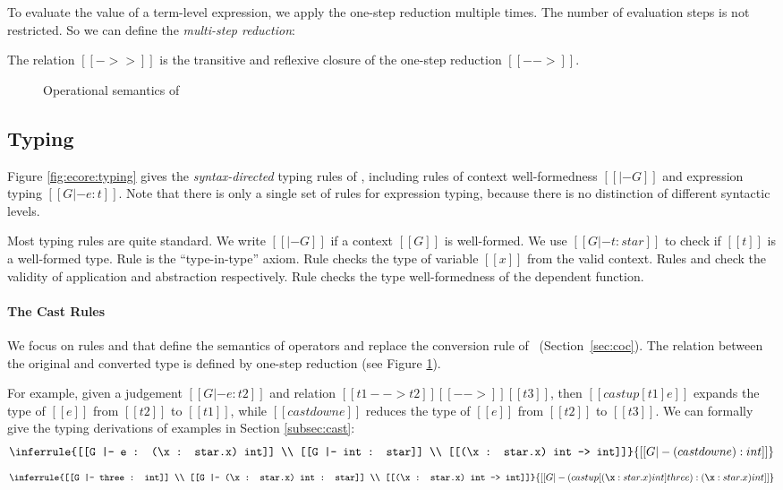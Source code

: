 To evaluate the value of a term-level expression, we apply the
one-step reduction multiple times. The number of evaluation steps is
not restricted. So we can define the \emph{multi-step reduction}:

\begin{dfn}
    The relation $[[->>]]$ is the transitive and reflexive closure of
    the one-step reduction $[[-->]]$.
\end{dfn}

\begin{figure}
    \ottdefnstep{}
    \caption{Operational semantics of \ecore}
    \label{fig:ecore:opsem}
\end{figure}

\subsection{Typing}\label{sec:ecore:type}

Figure \ref{fig:ecore:typing} gives the \emph{syntax-directed} typing
rules of \ecore, including rules of context well-formedness $[[|- G]]$
and expression typing $[[G |- e : t]]$. Note that there is only a
single set of rules for expression typing, because there is no
distinction of different syntactic levels.

Most typing rules are quite standard. We write $[[|- G]]$ if a context
$[[G]]$ is well-formed. We use $[[G |- t : star]]$ to check if $[[t]]$ is a
well-formed type. Rule  is the ``type-in-type''
axiom. Rule  checks the type of variable $[[x]]$ from
the valid context. Rules  and  check
the validity of application and abstraction respectively. Rule 
checks the type well-formedness of the dependent function.

\paragraph{The Cast Rules}
We focus on rules  and  that
define the semantics of \cast operators and replace the conversion
rule of \cc~(Section~\ref{sec:coc}). The relation between the original
and converted type is defined by one-step reduction (see Figure
\ref{fig:ecore:opsem}). 

For example, given a judgement
$[[G |- e : t2]]$ and relation $[[t1 --> t2]] [[-->]] [[t3]]$, then
$[[castup [t1] e]]$ expands the type of $[[e]]$ from $[[t2]]$ to
$[[t1]]$, while $[[castdown e]]$ reduces the type of $[[e]]$ from
$[[t2]]$ to $[[t3]]$. We can formally give the typing derivations of 
examples in Section \ref{subsec:cast}:
\[
\inferrule{[[G |- e : (\x : star.x) int]] \\ [[G |- int : star]] \\ [[(\x :
star.x) int --> int]]}{[[G |- (castdown e):int]]}
\]
\[
\inferrule{[[G |- three : int]] \\ [[G |- (\x : star.x) int : star]] \\ [[(\x :
star.x) int --> int]]}{[[G |- (castup[(\x : star.x) int] three):(\x : star.x)
int]]}
\]

